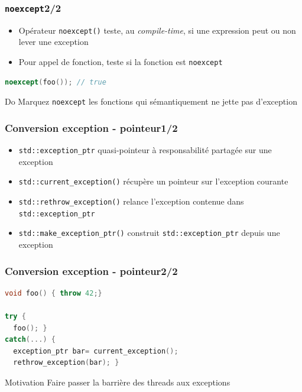 \documentclass[C++.tex]{subfiles}
\begin{document}
\begin{frame}[fragile]
	\frametitle{\lstinline|noexcept|\titlehfill{}2/2}
	\begin{itemize}
		\item Opérateur \lstinline|noexcept()| teste, au \textit{compile-time}, si une expression peut ou non lever une exception
		\item Pour appel de fonction, teste si la fonction est \lstinline|noexcept|

	\end{itemize}

	\begin{lstlisting}[language=C++]
noexcept(foo()); // true\end{lstlisting}

	\begin{exampleblock}{Do}
		Marquez \lstinline|noexcept| les fonctions qui sémantiquement ne jette pas d'exception

	\end{exampleblock}
\end{frame}

\begin{frame}[fragile]
	\frametitle{Conversion exception - pointeur\titlehfill{}1/2}
	\begin{itemize}
		\item \lstinline|std::exception_ptr| quasi-pointeur à responsabilité partagée sur une exception
		\item \lstinline|std::current_exception()| récupère un pointeur sur l'exception courante
		\item \lstinline|std::rethrow_exception()| relance l'exception contenue dans \lstinline|std::exception_ptr| 
		\item \lstinline|std::make_exception_ptr()| construit \lstinline|std::exception_ptr| depuis une exception
	\end{itemize}
\end{frame}

\begin{frame}[fragile]
	\frametitle{Conversion exception - pointeur\titlehfill{}2/2}
	\begin{lstlisting}[language=C++]
void foo() { throw 42;}

try {
  foo(); }
catch(...) {
  exception_ptr bar= current_exception();
  rethrow_exception(bar); } \end{lstlisting}

	\begin{block}{Motivation}
		Faire passer la barrière des threads aux exceptions
	\end{block}
\end{frame}
\end{document}
